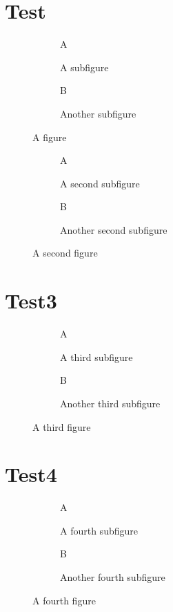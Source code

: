 \documentclass{book}
\begin{document}
\listoffigures

\chapter{Test}
\begin{figure}
  \begin{subfigure}[b]{.5\linewidth}
    \centering\large A
    \caption{A subfigure}\label{fig:1a}
  \end{subfigure}%
  \begin{subfigure}[b]{.5\linewidth}
    \centering\large B
    \caption{Another subfigure}\label{fig:1b}
  \end{subfigure}
  \caption{A figure}\label{fig:1}
\end{figure}


\begin{figure}
  \begin{subfigure}[b]{.5\linewidth}
    \centering\large A
    \caption{A  second subfigure}\label{fig:2a}
  \end{subfigure}%
  \begin{subfigure}[b]{.5\linewidth}
    \centering\large B
    \caption{Another second subfigure}\label{fig:2b}
  \end{subfigure}
  \caption{A second figure}\label{fig:2}
\end{figure}

\chapter{Test3}
\begin{figure}
  \begin{subfigure}[b]{.5\linewidth}
    \centering\large A
    \caption{A third subfigure}\label{fig:3a}
  \end{subfigure}%
  \begin{subfigure}[b]{.5\linewidth}
    \centering\large B
    \caption{Another third subfigure}\label{fig:3b}
  \end{subfigure}
  \caption{A third figure}\label{fig:3}
\end{figure}

\chapter{Test4}
\begin{figure}
  \begin{subfigure}[b]{.5\linewidth}
    \centering\large A
    \caption{A fourth subfigure}\label{fig:4a}
  \end{subfigure}%
  \begin{subfigure}[b]{.5\linewidth}
    \centering\large B
    \caption{Another fourth subfigure}\label{fig:4b}
  \end{subfigure}
  \caption{A fourth figure}\label{fig:4}
\end{figure}
\end{document}
